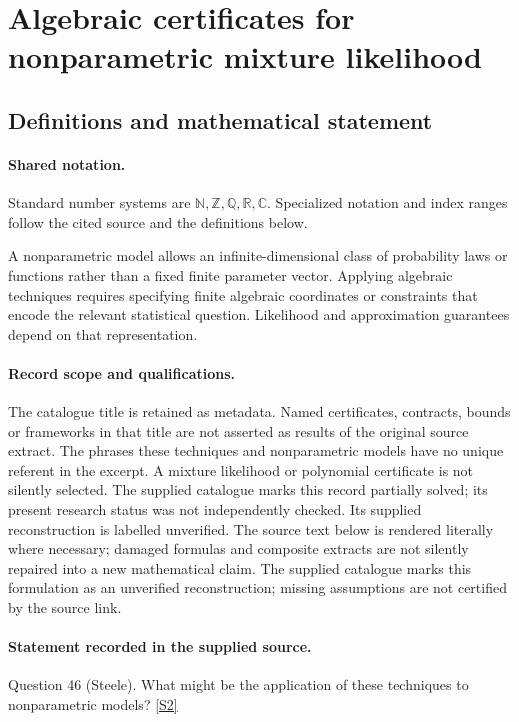 \documentclass[11pt]{article}
\newcommand{\sref}[2]{\hyperlink{source:#1:#2}{[S#2]}}
\begin{document}
\section{Algebraic certificates for nonparametric mixture likelihood}\label{statement}

\subsection{Definitions and mathematical statement}

\paragraph{Shared notation.}Standard number systems are $\mathbb N,\mathbb Z,\mathbb Q,\mathbb R,\mathbb C$. Specialized notation and index ranges follow the cited source and the definitions below.


A nonparametric model allows an infinite-dimensional class of probability laws or functions rather than a fixed finite parameter vector. Applying algebraic techniques requires specifying finite algebraic coordinates or constraints that encode the relevant statistical question. Likelihood and approximation guarantees depend on that representation.
\paragraph{Record scope and qualifications.}
The catalogue title is retained as metadata. Named certificates, contracts, bounds or frameworks in that title are not asserted as results of the original source extract.
The phrases these techniques and nonparametric models have no unique referent in the excerpt. A mixture likelihood or polynomial certificate is not silently selected. The supplied catalogue marks this record partially solved; its present research status was not independently checked. Its supplied reconstruction is labelled unverified.
The source text below is rendered literally where necessary; damaged formulas and composite extracts are not silently repaired into a new mathematical claim.
The supplied catalogue marks this formulation as an unverified reconstruction; missing assumptions are not certified by the source link.
\paragraph{Statement recorded in the supplied source.}
Question 46 (Steele). What might be the application of these techniques to nonparametric models? \sref{statement}{2}
\end{document}
